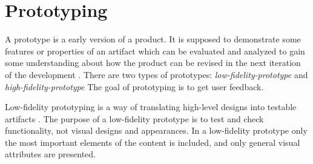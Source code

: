 \documentclass[../Main/thesis.tex]{subfiles}
\begin{document}
%


\section{Prototyping}
\label{sec:prototyping}
A prototype is a early version of a product. 
It is supposed to demonstrate some features or properties of an artifact which can be evaluated and analyzed to gain some understanding about how the product can be revised in the next iteration of the development \citep{oates2005researching}.
There are two types of prototypes: \textit{low-fidelity-prototype} and \textit{high-fidelity-prototype}
The goal of prototyping is to get user feedback.

Low-fidelity prototyping is a way of translating high-level designs into testable artifacts \citep{Babich2017}.
The purpose of a low-fidelity prototype is to test and check functionality, not visual designs and appearances.
In a low-fidelity prototype only the most important elements of the content is included, and only general visual attributes are presented.
\end{document}

